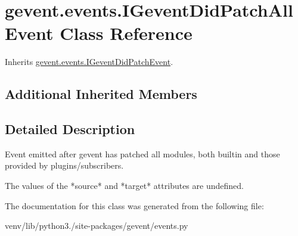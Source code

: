 \hypertarget{classgevent_1_1events_1_1_i_gevent_did_patch_all_event}{}\section{gevent.\+events.\+I\+Gevent\+Did\+Patch\+All\+Event Class Reference}
\label{classgevent_1_1events_1_1_i_gevent_did_patch_all_event}


Inherits \hyperlink{classgevent_1_1events_1_1_i_gevent_did_patch_event}{gevent.\+events.\+I\+Gevent\+Did\+Patch\+Event}.

\subsection*{Additional Inherited Members}


\subsection{Detailed Description}
\begin{DoxyVerb}Event emitted after gevent has patched all modules, both builtin
and those provided by plugins/subscribers.

The values of the *source* and *target* attributes are undefined.
\end{DoxyVerb}
 

The documentation for this class was generated from the following file\+:\begin{DoxyCompactItemize}
\item 
venv/lib/python3./site-\/packages/gevent/events.\+py\end{DoxyCompactItemize}

